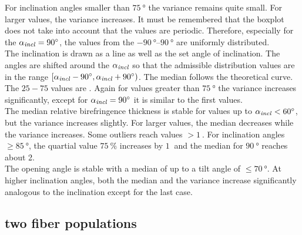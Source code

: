 For inclination angles smaller than $\SI{75}{\degree}$ the variance remains quite small.
For larger values, the variance increases.
It must be remembered that the boxplot does not take into account that the values are periodic.
Therefore, especially for the $\textnormal{$\alpha_{\mathit{incl}}$}=\SI{90}{\degree}$, the values from the $\SIrange{-90}{90}{\degree}$ are uniformly distributed.
\\
% 
The inclination is drawn as a line as well as the set angle of inclination.
The angles are shifted around the $\textnormal{$\alpha_{\mathit{incl}}$}$ so that the admissible distribution values are in the range $[\textnormal{$\alpha_{\mathit{incl}}$}-\SI{90}{\degree}, \textnormal{$\alpha_{\mathit{incl}}$}+\SI{90}{\degree})$.
The median follows the theoretical curve.
The $25-75$ values are \dummy{} .
Again for values greater than $\SI{75}{\degree}$ the variance increases significantly, except for $\textnormal{$\alpha_{\mathit{incl}}$} = \SI{90}{\degree}$ it is similar to the first values.
\\
% 
The median relative birefringence thickness \trel{} is stable for values up to $\textnormal{$\alpha_{\mathit{incl}}$} < \SI{60}{\degree}$, but the variance increases slightly.
For larger values, the median decreases while the variance increases.
Some outliers reach values $>\SI{1}{}$.
For inclination angles $\ge \SI{85}{\degree}$, the quartial value $\SI{75}{\percent}$ increases by $\SI{1}{}$ and the median for $\SI{90}{\degree}$ reaches about 2.
\\
% 
The opening angle is stable with a median of \dummy{} up to a tilt angle of $\le \SI{70}{\degree}$.
At higher inclination angles, both the median and the variance increase significantly analogous to the inclination except for the last case.
% 
% 
% 
\subsection{two fiber populations}
% 
